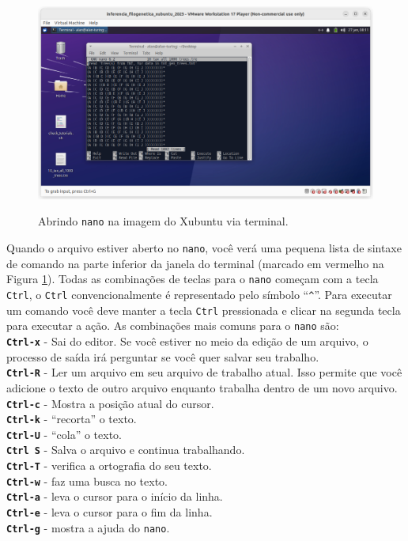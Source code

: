 \begin{refsection}
  \begin{figure}[H]
       \centering
      {\includegraphics[scale=0.35]{figures/tut2/nano.jpg}}
      {\caption[\textit{Abrindo \texttt{nano} }]{Abrindo \texttt{nano} na imagem do Xubuntu via terminal.}\label{tut2:fig:nano}}
  \end{figure}


Quando o arquivo estiver aberto no \texttt{nano}, você verá uma pequena lista de sintaxe de comando na parte inferior da janela do terminal (marcado em vermelho na Figura \ref{tut2:fig:nano}). Todas as combinações de teclas para o \texttt{nano} começam com a tecla \texttt{Ctrl}, o \texttt{Ctrl} convencionalmente é representado pelo símbolo ``\texttt{\^{}}''. Para executar um comando você deve manter a tecla \texttt{Ctrl} pressionada e clicar na segunda tecla para executar a ação. As combinações mais comuns para o \texttt{nano} são:\\

\noindent\textbf{\texttt{Ctrl-x}} - Sai do editor. Se você estiver no meio da edição de um arquivo, o processo de saída irá perguntar se você quer salvar seu trabalho.\\
\textbf{\texttt{Ctrl-R}} - Ler um arquivo em seu arquivo de trabalho atual. Isso permite que você adicione o texto de outro arquivo enquanto trabalha dentro de um novo arquivo.\\
\textbf{\texttt{Ctrl-c}} - Mostra a posição atual do cursor.\\
\textbf{\texttt{Ctrl-k}} - ``recorta'' o texto.\\
\textbf{\texttt{Ctrl-U}} - ``cola'' o texto.\\
\textbf{\texttt{Ctrl S}} - Salva o arquivo e continua trabalhando.\\
\textbf{\texttt{Ctrl-T}} - verifica a ortografia do seu texto.\\
\textbf{\texttt{Ctrl-w}} - faz uma busca no texto.\\
\textbf{\texttt{Ctrl-a}} - leva o cursor para o início da linha.\\
\textbf{\texttt{Ctrl-e}} - leva o cursor para o fim da linha.\\
\textbf{\texttt{Ctrl-g}} - mostra a ajuda do \texttt{nano}.\\


\end{refsection}
